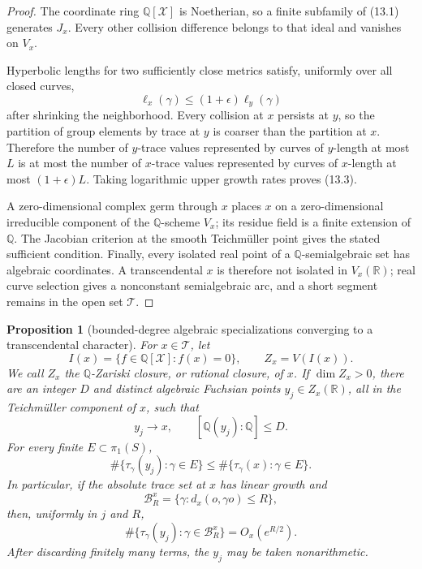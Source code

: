 \documentclass[11pt,reqno]{amsart}
\newtheorem{proposition}[theorem]{Proposition}
\theoremstyle{definition}
\theoremstyle{remark}
\newcommand{\R}{\mathbb R}
\newcommand{\Q}{\mathbb Q}
\begin{document}
\begin{proof}
The coordinate ring \(\Q[\mathcal X]\) is Noetherian, so a finite subfamily
of (13.1) generates \(J_x\).  Every other collision difference belongs to
that ideal and vanishes on \(V_x\).

Hyperbolic lengths for two sufficiently close metrics satisfy, uniformly over
all closed curves,
\[
 \ell_x(\gamma)\le(1+\epsilon)\ell_y(\gamma)
\]
after shrinking the neighborhood.  Every collision at \(x\) persists at
\(y\), so the partition of group elements by trace at \(y\) is coarser than
the partition at \(x\).  Therefore the number of \(y\)-trace values represented
by curves of \(y\)-length at most \(L\) is at most the number of \(x\)-trace
values represented by curves of \(x\)-length at most \((1+\epsilon)L\).
Taking logarithmic upper growth rates proves (13.3).

A zero-dimensional complex germ through \(x\) places \(x\) on a
zero-dimensional irreducible component of the \(\Q\)-scheme \(V_x\); its
residue field is a finite extension of \(\Q\).  The Jacobian criterion at
the smooth Teichm\"uller point gives the stated sufficient condition.
Finally, every isolated real point of a
\(\Q\)-semialgebraic set has algebraic coordinates.  A transcendental \(x\)
is therefore not isolated in \(V_x(\R)\); real curve selection gives a
nonconstant semialgebraic arc, and a short segment remains in the open set
\(\mathcal T\).
\end{proof}

\begin{proposition}[bounded-degree algebraic specializations converging to a transcendental character]
\label{prop:bounded-degree-specialization}
For \(x\in\mathcal T\), let
\[
 I(x)=\{f\in\Q[\mathcal X]:f(x)=0\},\qquad
 Z_x=V(I(x)).
\]
We call \(Z_x\) the \(\Q\)-Zariski closure, or rational closure, of \(x\).
If \(\dim Z_x>0\), there are an integer \(D\) and distinct algebraic
Fuchsian points \(y_j\in Z_x(\R)\), all in the Teichm\"uller component of
\(x\), such that
\[
 y_j\longrightarrow x,\qquad [\Q(y_j):\Q]\le D.
\tag{13.3a}
\]
For every finite \(E\subset\pi_1(S)\),
\[
 \#\{\tau_\gamma(y_j):\gamma\in E\}
 \le
 \#\{\tau_\gamma(x):\gamma\in E\}.
\tag{13.3b}
\]
In particular, if the absolute trace set at \(x\) has linear growth and
\[
 \mathcal B_R^x
 =\{\gamma:d_x(o,\gamma o)\le R\},
\]
then, uniformly in \(j\) and \(R\),
\[
 \#\{\tau_\gamma(y_j):\gamma\in\mathcal B_R^x\}
 =O_x(e^{R/2}).
\tag{13.3c}
\]
After discarding finitely many terms, the \(y_j\) may be taken
nonarithmetic.
\end{proposition}
\end{document}
